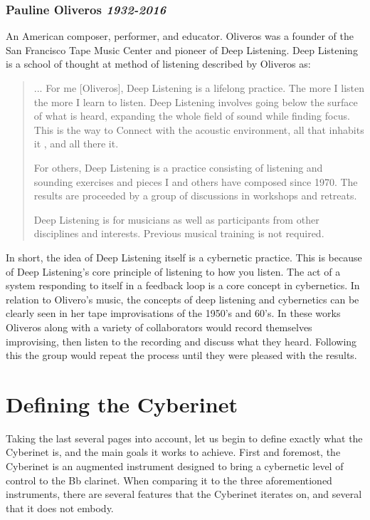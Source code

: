 \subsubsection{Pauline Oliveros \textit{1932-2016}}
An American composer, performer, and educator. Oliveros was a founder of the San Francisco Tape Music Center and pioneer of Deep Listening.\cite{HolmesElectronicMusic2020} Deep Listening is a school of thought at method of listening described by Oliveros as:

\begin{quote}
    ... For me [Oliveros], Deep Listening is a lifelong practice. The more I listen the more I learn to listen. Deep Listening involves going below the surface of what is heard, expanding the whole field of sound while finding focus. This is the way to Connect with the acoustic environment, all that inhabits it , and all there it.

    For others, Deep Listening is a practice consisting of listening and sounding exercises and pieces I and others have composed since 1970. The results are proceeded by a group of discussions in workshops and retreats. 

    Deep Listening is for musicians as well as participants from other disciplines and interests. Previous musical training is not required.\cite{cultureandHumanity2002}
\end{quote}

In short, the idea of Deep Listening itself is a cybernetic practice.\cite{gordosOliverosCybernetics} This is because of Deep Listening's core principle of listening to how you listen. The act of a system responding to itself in a feedback loop is a core concept in cybernetics. In relation to Olivero's music, the concepts of deep listening and cybernetics can be clearly seen in her tape improvisations of the 1950's and 60's. In these works Oliveros along with a variety of collaborators would record themselves improvising, then listen to the recording and discuss what they heard. Following this the group would repeat the process until they were pleased with the results.\cite{gordosOliverosCybernetics} 

\section{Defining the Cyberinet}


Taking the last several pages into account, let us begin to define exactly what the Cyberinet is, and the main goals it works to achieve. First and foremost, the Cyberinet is an augmented instrument designed to bring a cybernetic level of control to the Bb clarinet. When comparing it to the three aforementioned instruments, there are several features that the Cyberinet iterates on, and several that it does not embody.

